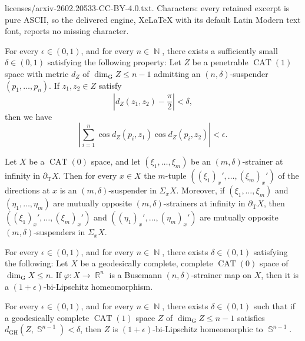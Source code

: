 \documentclass[10pt,a4paper]{amsart}
\newcommand{\CAT}{\operatorname{CAT}}
\newcommand{\GH}{\operatorname{\mathrm{GH}}}
\newcommand{\N}{\operatorname{\mathbb{N}}}
\newcommand{\R}{\operatorname{\mathbb{R}}}
\newcommand{\Sph}{\operatorname{\mathbb{S}}}
\begin{document}
licenses/arxiv-2602.20533-CC-BY-4.0.txt. Characters: every retained excerpt is pure ASCII, so the delivered engine, XeLaTeX with its default Latin Modern text font, reports no missing character.
\begin{lem}\label{lem: aperp}
For every $\epsilon \in (0,1)$,
and for every $n \in \N$,
there exists a sufficiently small $\delta \in (0,1)$ 
satisfying the following property:
Let $Z$ be a penetrable $\CAT(1)$ space with metric $d_Z$
of $\dim_{\mathrm{G}}Z \le n-1$
admitting an $(n,\delta)$-suspender
$(p_1,\dots,p_n)$.
If $z_1, z_2 \in Z$ satisfy 
\[
\left\vert d_Z(z_1,z_2) - \frac{\pi}{2} \right\vert < \delta,
\]
then we have
\[
\left\vert
\sum_{i=1}^n \cos d_Z \left( p_i, z_1 \right)
\cos d_Z \left( p_i, z_2 \right)
\right\vert
< \epsilon.
\]
\end{lem}

\begin{lem}\label{lem: sphstrinf}
Let $X$ be a $\CAT(0)$ space,
and let $(\xi_1, \dots, \xi_m)$ be an $(m,\delta)$-strainer at infinity
in $\partial_{\mathrm{T}}X$.
Then for every $x \in X$ the $m$-tuple
$((\xi_1)_x', \dots, (\xi_m)_x')$ of the directions at $x$
is an $(m,\delta)$-suspender in $\Sigma_xX$.
Moreover,
if $(\xi_1, \dots, \xi_m)$ and $(\eta_1, \dots, \eta_m)$ 
are mutually opposite $(m,\delta)$-strainers at infinity
in $\partial_{\mathrm{T}}X$,
then 
$\left( (\xi_1)_x', \dots, (\xi_m)_x' \right)$ and 
$\left( (\eta_1)_x', \dots, (\eta_m)_x' \right)$
are mutually opposite $(m,\delta)$-suspenders in $\Sigma_xX$.
\end{lem}

\begin{prop}\label{prop: fullbstr}
For every $\epsilon \in (0,1)$,
and for every $n \in \N$,
there exists 
$\delta \in (0,1)$ satisfying the following:
Let $X$ be a geodesically complete,
complete $\CAT(0)$ space of $\dim_{\mathrm{G}}X \le n$.
If $\varphi \colon X \to \R^n$
is a Busemann $(n,\delta)$-strainer map on $X$,
then it is a $(1+\epsilon)$-bi-Lipschitz homeomorphism.
\end{prop}

\begin{thm}
\label{thm: grcat1g}
For every $\epsilon \in (0,1)$,
and for every $n \in \N$,
there exists $\delta \in (0,1)$ such that
if a geodesically complete $\CAT(1)$ space $Z$
of $\dim_{\mathrm{G}} Z \le n-1$ satisfies
$d_{\GH} \left( Z, \Sph^{n-1} \right) < \delta$,
then $Z$ is $(1+\epsilon)$-bi-Lipschitz homeomorphic to $\Sph^{n-1}$.
\end{thm}
\end{document}
